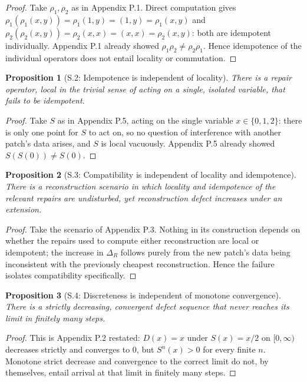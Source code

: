 \documentclass[11pt]{book}
\newtheorem*{appendixproposition}{Proposition}
\begin{document}
\begin{proof}
Take $\rho_1, \rho_2$ as in Appendix P.1. Direct computation gives $\rho_1(\rho_1(x,y)) = \rho_1(1,y) = (1,y) = \rho_1(x,y)$ and $\rho_2(\rho_2(x,y)) = \rho_2(x,x) = (x,x) = \rho_2(x,y)$: both are idempotent individually. Appendix P.1 already showed $\rho_1\rho_2 \neq \rho_2\rho_1$. Hence idempotence of the individual operators does not entail locality or commutation.
\end{proof}

\begin{appendixproposition}[S.2: Idempotence is independent of locality]
There is a repair operator, local in the trivial sense of acting on a single, isolated variable, that fails to be idempotent.
\end{appendixproposition}

\begin{proof}
Take $S$ as in Appendix P.5, acting on the single variable $x \in \{0,1,2\}$: there is only one point for $S$ to act on, so no question of interference with another patch's data arises, and $S$ is local vacuously. Appendix P.5 already showed $S(S(0)) \neq S(0)$.
\end{proof}

\begin{appendixproposition}[S.3: Compatibility is independent of locality and idempotence]
There is a reconstruction scenario in which locality and idempotence of the relevant repairs are undisturbed, yet reconstruction defect increases under an extension.
\end{appendixproposition}

\begin{proof}
Take the scenario of Appendix P.3. Nothing in its construction depends on whether the repairs used to compute either reconstruction are local or idempotent; the increase in $\Delta_R$ follows purely from the new patch's data being inconsistent with the previously cheapest reconstruction. Hence the failure isolates compatibility specifically.
\end{proof}

\begin{appendixproposition}[S.4: Discreteness is independent of monotone convergence]
There is a strictly decreasing, convergent defect sequence that never reaches its limit in finitely many steps.
\end{appendixproposition}

\begin{proof}
This is Appendix P.2 restated: $D(x) = x$ under $S(x) = x/2$ on $[0,\infty)$ decreases strictly and converges to $0$, but $S^n(x) > 0$ for every finite $n$. Monotone strict decrease and convergence to the correct limit do not, by themselves, entail arrival at that limit in finitely many steps.
\end{proof}
\end{document}
